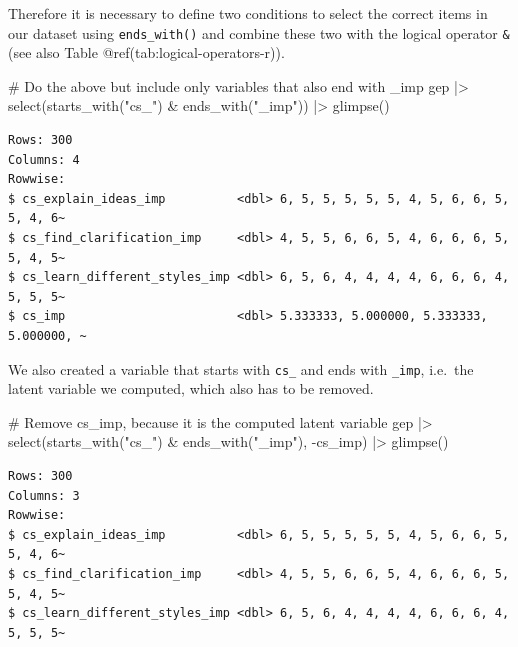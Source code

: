 \documentclass[
  letterpaper,
]{krantz}
\makeatletter
\newenvironment{Shaded}{\begin{snugshade}}{\end{snugshade}}
\newcommand{\CommentTok}[1]{\textcolor[rgb]{0.37,0.37,0.37}{#1}}
\newcommand{\FunctionTok}[1]{\textcolor[rgb]{0.28,0.35,0.67}{#1}}
\newcommand{\NormalTok}[1]{\textcolor[rgb]{0.00,0.23,0.31}{#1}}
\newcommand{\SpecialCharTok}[1]{\textcolor[rgb]{0.37,0.37,0.37}{#1}}
\newcommand{\StringTok}[1]{\textcolor[rgb]{0.13,0.47,0.30}{#1}}
\newenvironment{kframe}{%
\medskip{}
\setlength{\fboxsep}{.8em}
 \def\at@end@of@kframe{}%
 \ifinner\ifhmode%
  \def\at@end@of@kframe{\end{minipage}}%
  \begin{minipage}{\columnwidth}%
 \fi\fi%
 \def\FrameCommand##1{\hskip\@totalleftmargin \hskip-\fboxsep
 \colorbox{shadecolor}{##1}\hskip-\fboxsep
     \hskip-\linewidth \hskip-\@totalleftmargin \hskip\columnwidth}%
 \MakeFramed {\advance\hsize-\width
   \@totalleftmargin\z@ \linewidth\hsize
   \@setminipage}}%
 {\par\unskip\endMakeFramed%
 \at@end@of@kframe}
\renewenvironment{Shaded}{\begin{kframe}}{\end{kframe}}
\makeatother
\begin{document}
Therefore it is necessary to define two conditions to select the correct
items in our dataset using \texttt{ends\_with()} and combine these two
with the logical operator \texttt{\&} (see also Table
@ref(tab:logical-operators-r)).

\begin{Shaded}
\begin{Highlighting}[]
\CommentTok{\# Do the above but include only variables that also end with \textquotesingle{}\_imp\textquotesingle{}}
\NormalTok{gep }\SpecialCharTok{|\textgreater{}}
  \FunctionTok{select}\NormalTok{(}\FunctionTok{starts\_with}\NormalTok{(}\StringTok{"cs\_"}\NormalTok{) }\SpecialCharTok{\&} \FunctionTok{ends\_with}\NormalTok{(}\StringTok{"\_imp"}\NormalTok{)) }\SpecialCharTok{|\textgreater{}}
  \FunctionTok{glimpse}\NormalTok{()}
\end{Highlighting}
\end{Shaded}

\begin{verbatim}
Rows: 300
Columns: 4
Rowwise: 
$ cs_explain_ideas_imp          <dbl> 6, 5, 5, 5, 5, 5, 4, 5, 6, 6, 5, 5, 4, 6~
$ cs_find_clarification_imp     <dbl> 4, 5, 5, 6, 6, 5, 4, 6, 6, 6, 5, 5, 4, 5~
$ cs_learn_different_styles_imp <dbl> 6, 5, 6, 4, 4, 4, 4, 6, 6, 6, 4, 5, 5, 5~
$ cs_imp                        <dbl> 5.333333, 5.000000, 5.333333, 5.000000, ~
\end{verbatim}

We also created a variable that starts with \texttt{cs\_} and ends with
\texttt{\_imp}, i.e.~the latent variable we computed, which also has to
be removed.

\begin{Shaded}
\begin{Highlighting}[]
\CommentTok{\# Remove \textquotesingle{}cs\_imp\textquotesingle{}, because it is the computed latent variable}
\NormalTok{gep }\SpecialCharTok{|\textgreater{}}
  \FunctionTok{select}\NormalTok{(}\FunctionTok{starts\_with}\NormalTok{(}\StringTok{"cs\_"}\NormalTok{) }\SpecialCharTok{\&} \FunctionTok{ends\_with}\NormalTok{(}\StringTok{"\_imp"}\NormalTok{), }\SpecialCharTok{{-}}\NormalTok{cs\_imp) }\SpecialCharTok{|\textgreater{}}
  \FunctionTok{glimpse}\NormalTok{()}
\end{Highlighting}
\end{Shaded}

\begin{verbatim}
Rows: 300
Columns: 3
Rowwise: 
$ cs_explain_ideas_imp          <dbl> 6, 5, 5, 5, 5, 5, 4, 5, 6, 6, 5, 5, 4, 6~
$ cs_find_clarification_imp     <dbl> 4, 5, 5, 6, 6, 5, 4, 6, 6, 6, 5, 5, 4, 5~
$ cs_learn_different_styles_imp <dbl> 6, 5, 6, 4, 4, 4, 4, 6, 6, 6, 4, 5, 5, 5~
\end{verbatim}
\end{document}
